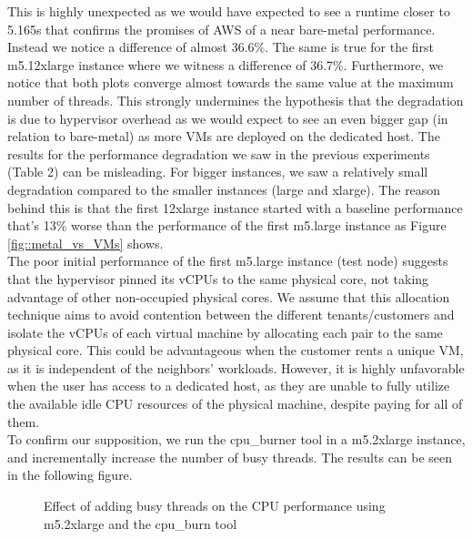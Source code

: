 This is highly unexpected as we would have expected to see a runtime closer to 5.165s that confirms 
the promises of AWS of a near bare-metal performance. Instead we notice a difference of almost 36.6\%. 
The same is true for the first m5.12xlarge instance where we witness a difference of 36.7\%. Furthermore, we notice that both plots converge almost towards the same value at 
the maximum number of threads. This strongly undermines the hypothesis that the degradation is due to 
hypervisor overhead as we would expect to see an even bigger gap (in relation to bare-metal) as 
more VMs are deployed on the dedicated host. The results for the performance degradation we saw in 
the previous experiments (Table 2) can be misleading. For bigger instances, we saw a relatively small 
degradation compared to the smaller instances (large and xlarge). The reason behind this is that the 
first 12xlarge instance started with a baseline performance that's 13\% worse than the performance 
of the first m5.large instance as Figure \ref{fig::metal_vs_VMs} shows. \\
The poor initial performance of the first m5.large instance (test node) suggests that the hypervisor 
pinned its vCPUs to the same physical core, not taking advantage of other non-occupied physical cores. 
We assume that this allocation technique aims to avoid contention between the different tenants/customers 
and isolate the vCPUs of each virtual machine by allocating each pair to the same physical core. 
This could be advantageous when the customer rents a unique VM, as it is independent of the neighbors’ 
workloads. However, it is highly unfavorable when the user has access to a dedicated host, as they 
are unable to fully utilize the available idle CPU resources of the physical machine, despite paying 
for all of them. \\
To confirm our supposition, we run the cpu\_burner tool in a m5.2xlarge instance, and incrementally 
increase the number of busy threads. The results can be seen in the following figure. 
\begin{figure}[H]
\centering
{}
\caption{Effect of adding busy threads on the CPU performance using m5.2xlarge and the cpu\_burn tool} 
\end{figure}
